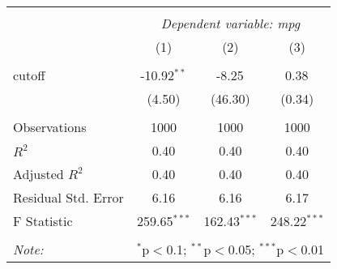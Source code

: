 \begin{tabular}{@{\extracolsep{5pt}}lccc}
\\[-1.8ex]\hline
\hline \\[-1.8ex]
& \multicolumn{3}{c}{\textit{Dependent variable: mpg}} \
\cr \cline{2-4}
\\[-1.8ex] & (1) & (2) & (3) \\
\hline \\[-1.8ex]
 cutoff & -10.92$^{**}$ & -8.25$^{}$ & 0.38$^{}$ \\
& (4.50) & (46.30) & (0.34) \\
\hline \\[-1.8ex]
 Observations & 1000 & 1000 & 1000 \\
 $R^2$ & 0.40 & 0.40 & 0.40 \\
 Adjusted $R^2$ & 0.40 & 0.40 & 0.40 \\
 Residual Std. Error & 6.16 & 6.16 & 6.17 \\
 F Statistic & 259.65$^{***}$ & 162.43$^{***}$ & 248.22$^{***}$ \\
\hline
\hline \\[-1.8ex]
\textit{Note:} & \multicolumn{3}{r}{$^{*}$p$<$0.1; $^{**}$p$<$0.05; $^{***}$p$<$0.01} \\
\end{tabular}